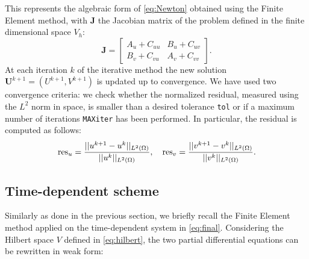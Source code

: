 This represents the algebraic form  of \eqref{eq:Newton} obtained using the Finite Element method, with $\mathbf{J}$ the Jacobian matrix of the problem defined in the finite dimensional space $V_h$:
\begin{equation}
  \mathbf{J} =   \begin{bmatrix} A_u + C_{uu}& B_u + C_{uv} \\B_v + C_{vu} & A_v + C_{vv} \end{bmatrix}.
\end{equation}
At each iteration $k$ of the iterative method the new solution $\mathbf{U}^{k+1} = \left( U^{k+1}, V^{k+1} \right)$ is updated up to convergence. We have used two convergence criteria: we check whether the normalized residual, measured using the $L^2$ norm in space, is smaller than a desired tolerance \verb|tol| or if a maximum number of iterations \verb|MAXiter| has been performed. In particular, the residual is computed as follows:
\begin{equation}
  \text{res}_u = {||u^{k+1} - u^k||_{L^2\left(\Omega\right)} \over ||u^k||_{L^2\left(\Omega\right)}}, \ \ \ \text{res}_v = {||v^{k+1} - v^k||_{L^2\left(\Omega\right)} \over ||v^k||_{L^2\left(\Omega\right)}}.
\end{equation}

\subsection{Time-dependent scheme}\label{sec:SI method}
Similarly as done in the previous section, we briefly recall the Finite Element method applied on the time-dependent system in \eqref{eq:final}. Considering the Hilbert space $V$ defined in \eqref{eq:hilbert}, the two partial differential equations can be rewritten in weak form:

